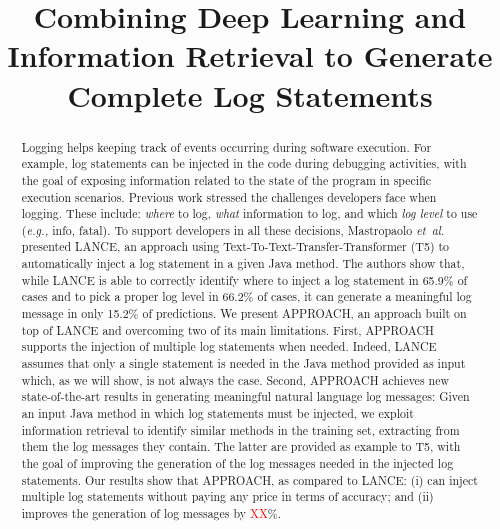 \documentclass[10pt,conference]{IEEEtran}
\newcommand{\eg}{\emph{e.g.,}\xspace}
\newcommand{\etal}{\emph{et~al.}\xspace}
\newcommand{\approach}{APPROACH\xspace}
\begin{document}
\title{Combining Deep Learning and Information Retrieval to Generate Complete Log Statements}


\maketitle

\begin{abstract}
Logging helps keeping track of events occurring during software execution. For example, log statements can be injected in the code during debugging activities, with the goal of exposing information related to the state of the program in specific execution scenarios. Previous work stressed the challenges developers face when logging. These include: \emph{where} to log, \emph{what} information to log, and which \emph{log level} to use (\eg info, fatal). To support developers in all these decisions, Mastropaolo \etal presented LANCE, an approach using Text-To-Text-Transfer-Transformer (T5) to automatically inject a log statement in a given Java method. The authors show that, while LANCE is able to correctly identify where to inject a log statement in 65.9\% of cases and to pick a proper log level in 66.2\% of cases, it can generate a meaningful log message in only 15.2\% of predictions. We present \approach, an approach built on top of LANCE and overcoming two of its main limitations. First, \approach supports the injection of multiple log statements when needed. Indeed, LANCE assumes that only a single statement is needed in the Java method provided as input which, as we will show, is not always the case. Second, \approach achieves new state-of-the-art results in generating meaningful natural language log messages: Given an input Java method in which log statements must be injected, we exploit information retrieval to identify similar methods in the training set, extracting from them the log messages they contain. The latter are provided as example to T5, with the goal of improving the generation of the log messages needed in the injected log statements. Our results show that \approach, as compared to LANCE: (i) can inject multiple log statements without paying any price in terms of accuracy; and (ii) improves the generation of log messages by \textcolor{red}{XX}\%.
\end{abstract}
\end{document}
